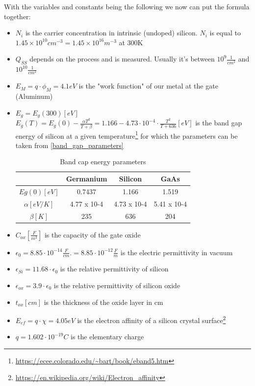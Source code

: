 With the variables and constants being the following we now can put the formula together:
\begin{itemize}
\item $N_i$ is the carrier concentration in intrinsic (undoped) silicon. $N_i$ is equal to $1.45 \times 10^{10} cm^{-3} = 1.45 \times 10^{16} m^{-3}$ at 300\degree K
\item $Q_{SS}$ depends on the process and is measured. Usually it's between $10^{9}\frac{1}{cm^2}$ and $10^{10}\frac{1}{cm^2}$
\item $E_M = q\cdot\phi_M = 4.1 eV$ is the "work function" of our metal at the gate (Aluminum)
\item $E_g=E_g(300) [eV]$ \\
$E_g(T) = E_g(0) - \frac{\alpha T^2}{T+\beta} = 1.166 - 4.73 \cdot 10^{-4} \cdot \frac{T^2}{T+636} [eV]$ is the band gap energy of silicon at a given temperature\footnote{\url{https://ecee.colorado.edu/~bart/book/eband5.htm}} for which the parameters can be taken from \autoref{band_gap_parameters}
\begin{table}[H]
\centering
\begin{tabular}{|c|c|c|c|}
\hline
{} &
\textbf{Germanium} &
\textbf{Silicon} &
\textbf{GaAs} \\
\hline
$Eg(0) [eV]$ &
0.7437 &
1.166 &
1.519 \\
\hline
$\alpha [eV/K]$ &
4.77 x 10-4 &
4.73 x 10-4 &
5.41 x 10-4 \\
\hline
$\beta [K]$ &
235 &
636 &
204 \\
\hline
\end{tabular}
\caption{Band cap energy parameters}
\label{band_gap_parameters}
\end{table}
\item $C_{ox} \left[\frac{F}{m^2}\right]$ is the capacity of the gate oxide
\item $\epsilon_0 = 8.85 \cdot 10^{-14} \frac{F}{cm}.= 8.85 \cdot 10^{-12} \frac{F}{m} $ is the electric permittivity in vacuum
\item $\epsilon_{Si} =11.68 \cdot \epsilon_0$ is the relative permittivity of silicon
\item $\epsilon_{ox} = 3.9 \cdot \epsilon_0$ is the relative permittivity of silicon oxide
\item $t_{ox} [cm]$ is the thickness of the oxide layer in cm
\item $E_{ef} = q \cdot \chi = 4.05 eV$ is the electron affinity of a silicon crystal surface\footnote{\url{https://en.wikipedia.org/wiki/Electron_affinity}}
\item $q=1.602 \cdot 10^{-19} C$ is the elementary charge
\end{itemize} 

